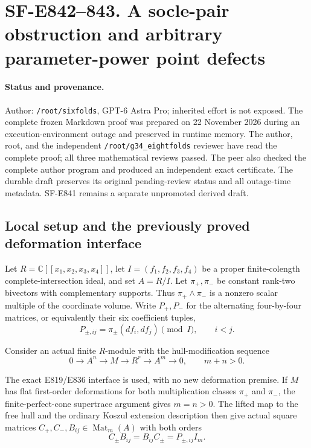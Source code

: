 \section{SF-E842--843. A socle-pair obstruction and arbitrary parameter-power point defects}
\label{SF-E842:section}

\paragraph{Status and provenance.}
Author: \texttt{/root/sixfolds}, GPT-6 Astra Pro; inherited effort is not exposed.
The complete frozen Markdown proof was prepared on 22 November 2026 during
an execution-environment outage and preserved in runtime memory. The author,
root, and the independent \texttt{/root/g34\_eightfolds} reviewer have read the
complete proof; all three mathematical reviews passed. The peer also checked
the complete author program and produced an independent exact certificate.
The durable draft preserves its original pending-review status and all
outage-time metadata. SF-E841 remains a separate unpromoted derived draft.

\subsection{Local setup and the previously proved deformation interface}
\label{SF-E842:interface}

Let \(R=\mathbb C[[x_1,x_2,x_3,x_4]]\), let
\(I=(f_1,f_2,f_3,f_4)\) be a proper finite-colength complete-intersection
ideal, and set \(A=R/I\). Let \(\pi_+,\pi_-\) be constant rank-two
bivectors with complementary supports. Thus \(\pi_+\wedge\pi_-\) is a
nonzero scalar multiple of the coordinate volume. Write \(P_+,P_-\)
for the alternating four-by-four matrices, or equivalently their six
coefficient tuples,
\[
 P_{\pm,ij}=\pi_\pm(df_i,df_j)\pmod I,\qquad i<j.
 \tag{E842.1}
\]

Consider an actual finite \(R\)-module with the hull-modification sequence
\[
 0\longrightarrow A^n\longrightarrow M\longrightarrow R^r
       \longrightarrow A^m\longrightarrow0,\qquad m+n>0.
 \tag{E842.2}
\]

The exact E819/E836 interface is used, with no new deformation premise.
If \(M\) has flat first-order deformations for both multiplication classes
\(\pi_+\) and \(\pi_-\), the finite-perfect-cone supertrace argument gives
\(m=n>0\). The lifted map to the free hull and the ordinary Koszul extension
description then give actual square matrices
\(C_+,C_-,B_{ij}\in\operatorname{Mat}_m(A)\) with both orders
\[
 C_\pm B_{ij}=B_{ij}C_\pm=P_{\pm,ij}I_m.
 \tag{E842.3}
\]

